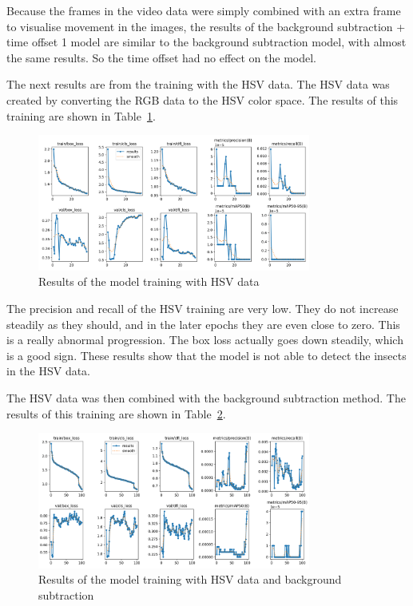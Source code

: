 Because the frames in the video data were simply combined with an extra frame to visualise movement in the images, the results of the background subtraction + time offset 1 model are similar to the background subtraction model, with almost the same results. So the time offset had no effect on the model.

The next results are from the training with the HSV data. The HSV data was created by converting the RGB data to the HSV color space. The results of this training are shown in Table~\ref{fig:results_hsv}.

\begin{figure}[htbp] 
    \centering
    \includegraphics[width=0.8\textwidth]{images/results/hsv_results.png}
    \caption{Results of the model training with HSV data}
    \label{fig:results_hsv}
\end{figure}

The precision and recall of the HSV training are very low. They do not increase steadily as they should, and in the later epochs they are even close to zero. This is a really abnormal progression. The box loss actually goes down steadily, which is a good sign. These results show that the model is not able to detect the insects in the HSV data.

The HSV data was then combined with the background subtraction method. The results of this training are shown in Table~\ref{fig:results_hsv_bgsub}.

\begin{figure}[htbp] 
    \centering
    \includegraphics[width=0.8\textwidth]{images/results/hsv_bgsub_results.png}
    \caption{Results of the model training with HSV data and background subtraction}
    \label{fig:results_hsv_bgsub}
\end{figure}

